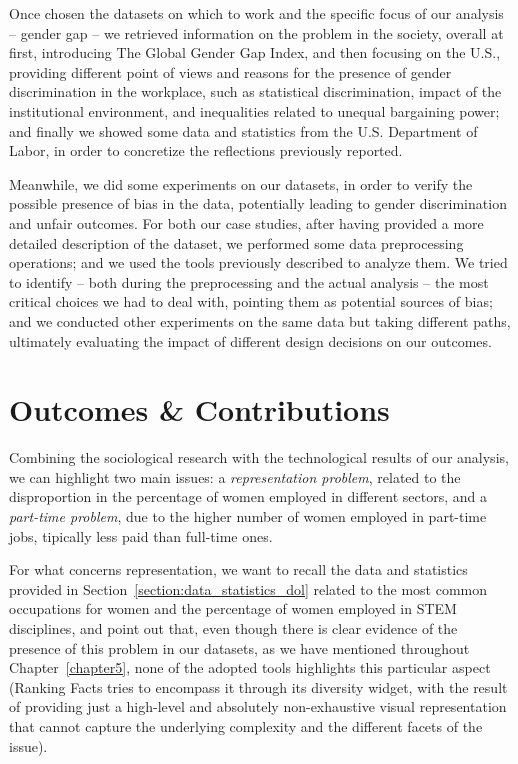 Once chosen the datasets on which to work and the specific focus of our analysis -- gender gap -- we retrieved information on the problem in the society, overall at first, introducing The Global Gender Gap Index, and then focusing on the U.S., providing different point of views and reasons for the presence of gender discrimination in the workplace, such as statistical discrimination, impact of the institutional environment, and inequalities related to unequal bargaining power; and finally we showed some data and statistics from the U.S. Department of Labor, in order to concretize the reflections previously reported.

Meanwhile, we did some experiments on our datasets, in order to verify the possible presence of bias in the data, potentially leading to gender discrimination and unfair outcomes. For both our case studies, after having provided a more detailed description of the dataset, we performed some data preprocessing operations; and we used the tools previously described to analyze them. We tried to identify -- both during the preprocessing and the actual analysis -- the most critical choices we had to deal with, pointing them as potential sources of bias; and we conducted other experiments on the same data but taking different paths, ultimately evaluating the impact of different design decisions on our outcomes.


\section{Outcomes \& Contributions}
Combining the sociological research with the technological results of our analysis, we can highlight two main issues: a \textit{representation problem}, related to the disproportion in the percentage of women employed in different sectors, and a \textit{part-time problem}, due to the higher number of women employed in part-time jobs, tipically less paid than full-time ones.

For what concerns representation, we want to recall the data and statistics provided in Section~\ref{section:data_statistics_dol} related to the most common occupations for women and the percentage of women employed in STEM disciplines, and point out that, even though there is clear evidence of the presence of this problem in our datasets, as we have mentioned throughout Chapter~\ref{chapter5}, none of the adopted tools highlights this particular aspect (Ranking Facts tries to encompass it through its diversity widget, with the result of providing just a high-level and absolutely non-exhaustive visual representation that cannot capture the underlying complexity and the different facets of the issue).

